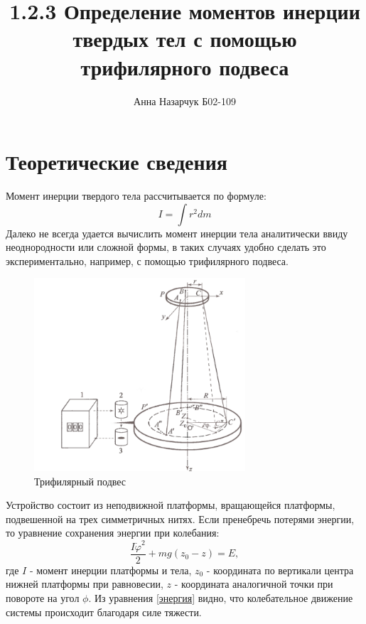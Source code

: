 \documentclass[a4paper,12pt]{article} %
\author{Анна Назарчук Б02-109}
\title{1.2.3 Определение моментов инерции твердых тел с помощью трифилярного подвеса}
\date{}
\begin{document}
\maketitle
\section{Теоретические сведения}
Момент инерции твердого тела рассчитывается по формуле:
\begin{equation}
I = \int r^2dm
\end{equation}
Далеко не всегда удается вычислить момент инерции тела аналитически ввиду неоднородности или сложной формы, в таких случаях удобно сделать это экспериментально, например, с помощью трифилярного подвеса.
\begin{figure}[h!]
\begin{center}
\includegraphics[width=0.7\textwidth]{Подвес}
\end{center}
\caption{Трифилярный подвес} \label{подвес}
\end{figure}
Устройство состоит из неподвижной платформы, вращающейся платформы, подвешенной на трех симметричных нитях.
Если пренебречь потерями энергии, то уравнение сохранения энергии при колебания:
\begin{equation}
\label{энергия}
\frac{I\dot{\varphi}^2}{2}+mg(z_0-z)=E,
\end{equation}
где $I$ - момент инерции платформы и тела, $z_0$ - координата по вертикали центра нижней платформы при равновесии, $z$ - координата аналогичной точки при повороте на угол $\phi$.
Из уравнения \ref{энергия} видно, что колебательное движение системы происходит благодаря силе тяжести. 
\end{document}
